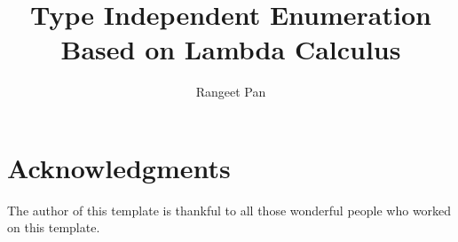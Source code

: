 \documentclass{llncs}
\begin{document}
\title{Type Independent Enumeration Based on Lambda Calculus}

\author{Rangeet Pan}
%



\maketitle

\begin{abstract}

\end{abstract}

 

%

 
%
%
%
\section{Acknowledgments}

The author of this template is thankful to all those 
wonderful people who worked on this template. 


  
\end{document}
